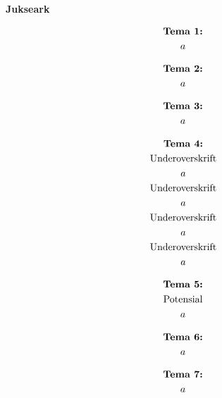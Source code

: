 \documentclass[8pt, A4paper, norsk]{extarticle}
\begin{document}
	\begin{center}
\Large \textbf{Jukseark}
	\end{center}
	\begin{multicols*}{3}
		\begin{gather*}
\text{\textbf{Tema 1:}} \\
a
		\end{gather*}





		\begin{gather*}
\text{\textbf{Tema 2:}} \\
a
		\end{gather*}





		\begin{gather*}
\text{\textbf{Tema 3:}} \\
a
		\end{gather*}






		\begin{gather*}
\text{\textbf{Tema 4:}} \\
\text{Underoverskrift} \\
a \\
\text{Underoverskrift} \\
a \\
\text{Underoverskrift} \\
a \\
\text{Underoverskrift} \\
a
		\end{gather*}






		\begin{gather*}
\text{\textbf{Tema 5:}} \\
\text{Potensial} \\
a
		\end{gather*}






		\begin{gather*}
\text{\textbf{Tema 6:}} \\
a
		\end{gather*}






		\begin{gather*}
\text{\textbf{Tema 7:}} \\
a
		\end{gather*}








\end{multicols*}
\end{document}
